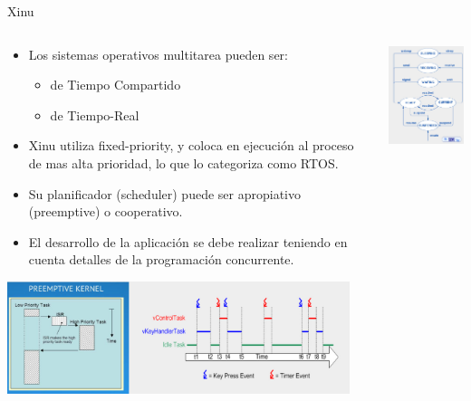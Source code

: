 \documentclass[8pt,aspectratio=169,compress]{beamer}
\begin{document}
\begin{frame}{Xinu}

    \begin{columns}[onlytextwidth,T]
      \column{\dimexpr\linewidth-50mm-5mm}

\begin{small}
	\begin{itemize}
\item [OS style]Los sistemas operativos multitarea pueden ser:
\begin{itemize}
\item de Tiempo Compartido
\item de Tiempo-Real
\end{itemize}

\item [Xinu RTOS] Xinu utiliza fixed-priority, y coloca en ejecución al proceso de mas alta prioridad, lo que lo categoriza como RTOS.

\bigskip
\item [Planificador] Su planificador (scheduler) puede ser apropiativo (preemptive) o cooperativo.

\bigskip
\item [Concurrente] El desarrollo de la aplicación se debe realizar teniendo en cuenta detalles de la programación concurrente.

	\end{itemize}

     \includegraphics[width=100mm]{images/preemptive.jpg}
\end{small}


      \column{50mm}
     \includegraphics[width=40mm]{images/estados.jpg}

    \end{columns}
\end{frame}
\end{document}
